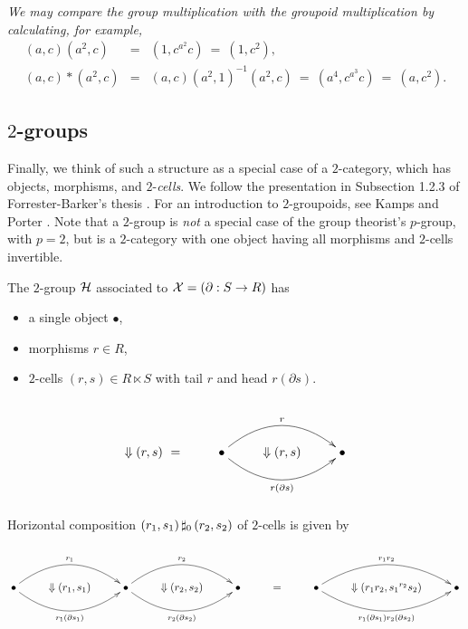 \begin{example}
\noindent
\emph{We may compare the group multiplication with the groupoid multiplication
by calculating, for example,}
\begin{eqnarray*}
(a,c)(a^2,c) &=& (1,c^{a^2}c) ~=~ (1,c^2), \\
(a,c)*(a^2,c)     &=& (a,c)(a^2,1)^{-1}(a^2,c) ~=~ (a^4,c^{a^3}c) ~=~ (a,c^2).
\end{eqnarray*}
\end{example}





\newpage
\subsection{$2$-groups} \label{subs:twogps}

Finally, we think of such a structure as a special case of a 
   
$2$-category, which has objects, morphisms, and $2$-\emph{cells}.
We follow the presentation in Subsection 1.2.3 of 
Forrester-Barker's thesis \cite{f-b-thesis}. 
For an introduction to $2$-groupoids, 
see Kamps and Porter \cite{kamps:port}.
Note that a $2$-group is \emph{not} a special case of the group theorist's 
$p$-group, with $p=2$, but is a $2$-category with one object having all 
morphisms and $2$-cells invertible.

The $2$-group $\mathcal{H}$ associated to $\mathcal{X} = (\partial : S \to R)$ has
\begin{itemize}
\item  a single object $\bullet$,
\item  morphisms $r \in R$,
\item  $2$-cells $(r,s) \in R \ltimes S$
       with tail $r$ and head $r(\partial s)$.
\end{itemize}
$$
\xy
\xymatrix{
   & & & \\
 \Downarrow (r,s)~= 
   & \bullet  \ar@/^5ex/[rr]^{r} 
              \ar@/_5ex/[rr]_{r(\partial s)} 
     & \Downarrow (r,s)
        & \bullet \\
   & & & \\
}
\endxy
$$

\noindent
Horizontal composition $(r_1,s_1) \,\sharp_0\, (r_2,s_2)$ 
of $2$-cells is given by
$$
\xy
\xymatrix{
  & &  & & & & & & \\
  \bullet \ar@/^5ex/[rr]^{r_1} 
          \ar@/_5ex/[rr]_{r_1(\partial s_1)} 
  & \Downarrow (r_1,s_1)
    & \bullet \ar@/^5ex/[rr]^{r_2} 
              \ar@/_5ex/[rr]_{r_2(\partial s_2)} 
      & \Downarrow (r_2,s_2)
        & \bullet 
          & = 
            & \bullet \ar@/^5ex/[rr]^{r_1r_2} 
                      \ar@/_5ex/[rr]_{r_1(\partial s_1)r_2(\partial s_2)} 
              & \Downarrow (r_1r_2,{s_1}^{r_2}{s_2})
                & \bullet \\
  & & & & & & & & \\
}
\endxy
$$

